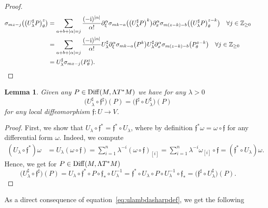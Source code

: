 \documentclass[10pt,a4paper]{amsart}
\numberwithin{equation}{section}
\newtheorem{lem}[thm]{Lemma}
\theoremstyle{definition}
\newcommand{\Z}{\mathbb Z}
\begin{document}
\begin{proof}
\begin{align*}
\sigma_{mz-j}\bigl(\bigl(U_\lambda^\sharp P\bigr)_\theta^z\bigr)&{}= \sum_{a+b+\vert \alpha\vert=j} \frac{(-{\rm i})^{\vert \alpha \vert}}{\alpha!} \partial_\xi^\alpha \sigma_{mk-a} \bigl(\bigl(U_\lambda^\sharp P\bigr)^k\bigr) \partial_x^\alpha\sigma_{m(z-k)-b}\bigl( \bigl(U_\lambda^\sharp P\bigr)_\theta^{z-k}\bigr)\quad \forall j\in \Z_{\geq 0}\\
&{}= \sum_{a+b+\vert \alpha\vert=j} \frac{(-{\rm i})^{\vert \alpha \vert}}{\alpha!} U_\lambda^\sharp\partial_\xi^\alpha \sigma_{mk-a} \bigl(P^k\bigr) U_\lambda^\sharp\partial_x^\alpha\sigma_{m(z-k)-b}\bigl( P_\theta^{z-k}\bigr)\quad \forall j\in \Z_{\geq 0}\\
&{}= U_\lambda^\sharp \sigma_{mz-j}( P_\theta^z).
\tag*{\qed}
\end{align*}
\renewcommand{\qed}{}
\end{proof}
\begin{lem} %
Given any $P\in {\rm Diff}(M,\Lambda T^*M)$ we have for any $\lambda>0$
\begin{equation}\label{eq:flambdaUlambda}
\bigl(U_\lambda^\sharp\circ\mathfrak{f}^\sharp\bigr)(P)=\bigl(\mathfrak{f}^\sharp\circ U_\lambda^\sharp\bigr)(P)
\end{equation}
for any local diffeomorphism $\mathfrak{f}\colon U\to V$.
\end{lem}
\begin{proof} First, we show that $U_\lambda\circ \mathfrak{f}^*=\mathfrak{f}^*\circ U_\lambda$, where by definition $\mathfrak{f}^*\omega=\omega\circ \mathfrak{f}$ for any differential form $\omega$. Indeed, we compute
\begin{align*}
(U_\lambda\circ \mathfrak{f}^*)\omega&{}=U_\lambda(\omega\circ \mathfrak{f})
=\sum_{i=1}^n \lambda^{-i}(\omega\circ \mathfrak{f})_{[i]}=\sum_{i=1}^n \lambda^{-i}\omega_{[i]}\circ \mathfrak{f}
=(\mathfrak{f}^*\circ U_\lambda)\omega.
\end{align*}
Hence, we get for $P\in {\rm Diff}(M,\Lambda T^*M)$
\[
\bigl(U_\lambda^\sharp\circ \mathfrak{f}^\sharp\bigr)(P)=U_\lambda\circ \mathfrak{f}^* \circ P\circ \mathfrak{f}_*\circ U_\lambda^{-1}=\mathfrak{f}^* \circ U_\lambda\circ P\circ U_\lambda^{-1}\circ \mathfrak{f}_*=\bigl(\mathfrak{f}^\sharp \circ U_\lambda^\sharp\bigr)(P).
\tag*{\qed}
\]
\renewcommand{\qed}{}
\end{proof}

As a direct consequence of equation~\eqref{eq:ulambdasharpdef}, we get the following
\end{document}
